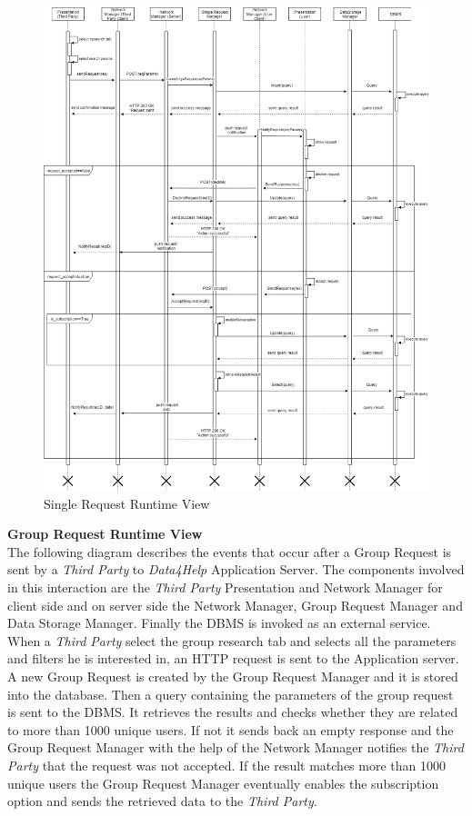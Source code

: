 \documentclass[titlepage]{article}
\begin{document}
	\begin{figure}[H]
		\center
		\includegraphics[width=15cm]{SingleRequest.png}
		\caption{Single Request Runtime View}
		\label{fig:SIGREQ}
	\end{figure}
	\noindent
	{\bf Group Request Runtime View }\\ 
	The following diagram describes the events that occur after a Group Request is sent by a {\it Third Party} to {\it Data4Help} Application Server. The components involved in this interaction are the {\it Third Party} Presentation and Network Manager for client side and  on server side the Network Manager, Group Request Manager and Data Storage Manager. Finally the DBMS is invoked as an external service.
	When a {\it Third Party} select the group research tab and selects all the parameters and filters he is interested in, an HTTP request is sent to the Application server. A new Group Request is created by the Group Request Manager and it is stored into the database. Then a query containing the parameters of the group request is sent to the DBMS. It retrieves the results and checks whether they are related to more than 1000 unique users. If not it sends back an empty response and the Group Request Manager with the help of the Network Manager notifies the {\it Third Party} that the request was not accepted. If the result matches more than 1000 unique users the Group Request Manager eventually enables the subscription option and sends the retrieved data to the {\it Third Party}.
	
\end{document}
